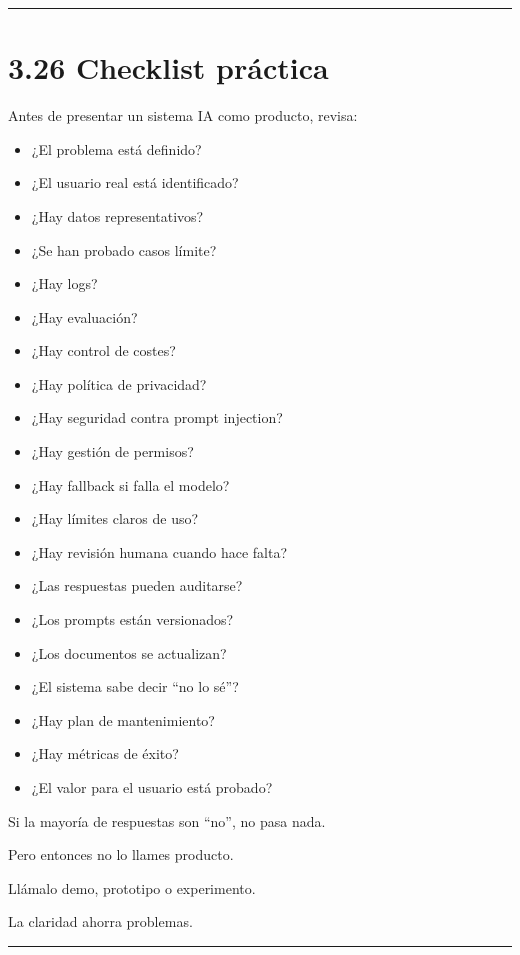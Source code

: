 \begin{center}\rule{0.5\linewidth}{0.5pt}\end{center}

\section{3.26 Checklist práctica}\label{checklist-pruxe1ctica-2}

Antes de presentar un sistema IA como producto, revisa:

\begin{itemize}
\tightlist
\item
  ¿El problema está definido?
\item
  ¿El usuario real está identificado?
\item
  ¿Hay datos representativos?
\item
  ¿Se han probado casos límite?
\item
  ¿Hay logs?
\item
  ¿Hay evaluación?
\item
  ¿Hay control de costes?
\item
  ¿Hay política de privacidad?
\item
  ¿Hay seguridad contra prompt injection?
\item
  ¿Hay gestión de permisos?
\item
  ¿Hay fallback si falla el modelo?
\item
  ¿Hay límites claros de uso?
\item
  ¿Hay revisión humana cuando hace falta?
\item
  ¿Las respuestas pueden auditarse?
\item
  ¿Los prompts están versionados?
\item
  ¿Los documentos se actualizan?
\item
  ¿El sistema sabe decir ``no lo sé''?
\item
  ¿Hay plan de mantenimiento?
\item
  ¿Hay métricas de éxito?
\item
  ¿El valor para el usuario está probado?
\end{itemize}

Si la mayoría de respuestas son ``no'', no pasa nada.

Pero entonces no lo llames producto.

Llámalo demo, prototipo o experimento.

La claridad ahorra problemas.

\begin{center}\rule{0.5\linewidth}{0.5pt}\end{center}

